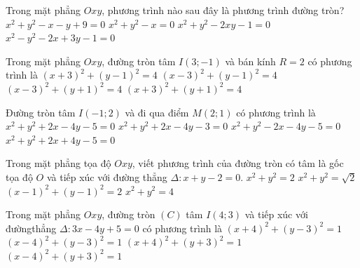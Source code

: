 \begin{ex}%
	Trong mặt  phẳng $Oxy$, phương trình nào sau đây là phương trình đường tròn?
	\choice 
		{$x^2+y^2-x-y+9=0$} 
		 {\True $x^2+y^2-x=0$}
		{$x^2+y^2-2xy-1=0$} 
		{$x^2-y^2-2x+3y-1=0$} 
\end{ex}

\begin{ex}%
	Trong mặt phẳng $Oxy$, đường tròn tâm $I(3;-1)$ và bán kính  $R=2$ có phương trình là
	 \choice
		 {$(x+3)^2+(y-1)^2=4$}
		 {$(x-3)^2+(y-1)^2=4$}
		 {\True $(x-3)^2+(y+1)^2=4$}
		 {$(x+3)^2+(y+1)^2=4$}
\end{ex}

\begin{ex}%
	Đường tròn  tâm $I(-1; 2)$ và đi qua điểm $M(2; 1)$ có phương trình là
	\choice 
		{\True  $x^2+y^2+2x-4y-5=0$}
		{$x^2+y^2+2x-4y-3=0$} 
		{$x^2+y^2-2x-4y-5=0$} 
		 {$x^2+y^2+2x+4y-5=0$}
\end{ex}

\begin{ex}%
	Trong mặt phẳng  tọa độ $Oxy$, viết phương trình của đường tròn có tâm là gốc tọa độ $O$ và tiếp xúc với đường thẳng $\Delta\colon x+y-2=0$.
	 \choice
		{\True  $x^2+y^2=2$}
		 {$x^2+y^2=\sqrt{2}$}
		{$(x-1)^2+(y-1)^2=2$} 
		{$x^2+y^2=4$} 
\end{ex}

\begin{ex}%
	Trong mặt phẳng $Oxy$, đường tròn $(C)$ tâm $I(4;3)$ và tiếp xúc với đườngthẳng $\Delta \colon 3x-4y+5=0$ có phương trình là 
	 \choice
		 {$(x+4)^2+(y-3)^2=1$}
		{\True  $(x-4)^2+(y-3)^2=1$}
		 {$(x+4)^2+(y+3)^2=1$}
		{$(x-4)^2+(y+3)^2=1$} 
\end{ex}

